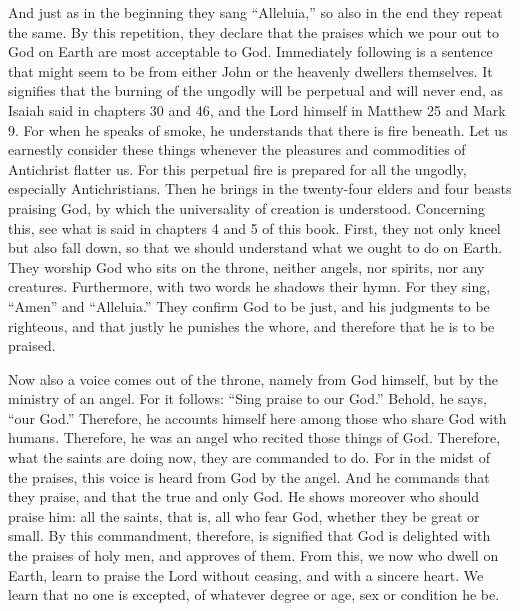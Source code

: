 And just as in the beginning they sang “Alleluia,” so also in the end they repeat the same. By this repetition, they declare that the praises which we pour out to God on Earth are most acceptable to God. Immediately following is a sentence that might seem to be from either John or the heavenly dwellers themselves. It signifies that the burning of the ungodly will be perpetual and will never end, as Isaiah said in chapters 30 and 46, and the Lord himself in Matthew 25 and Mark 9. For when he speaks of smoke, he understands that there is fire beneath. Let us earnestly consider these things whenever the pleasures and commodities of Antichrist flatter us. For this perpetual fire is prepared for all the ungodly, especially Antichristians. Then he brings in the twenty-four elders and four beasts praising God, by which the universality of creation is understood. Concerning this, see what is said in chapters 4 and 5 of this book. First, they not only kneel but also fall down, so that we should understand what we ought to do on Earth. They worship God who sits on the throne, neither angels, nor spirits, nor any creatures. Furthermore, with two words he shadows their hymn. For they sing, “Amen” and “Alleluia.” They confirm God to be just, and his judgments to be righteous, and that justly he punishes the whore, and therefore that he is to be praised.

Now also a voice comes out of the throne, namely from God himself, but by the ministry of an angel. For it follows: “Sing praise to our God.” Behold, he says, “our God.” Therefore, he accounts himself here among those who share God with humans. Therefore, he was an angel who recited those things of God. Therefore, what the saints are doing now, they are commanded to do. For in the midst of the praises, this voice is heard from God by the angel. And he commands that they praise, and that the true and only God. He shows moreover who should praise him: all the saints, that is, all who fear God, whether they be great or small. By this commandment, therefore, is signified that God is delighted with the praises of holy men, and approves of them. From this, we now who dwell on Earth, learn to praise the Lord without ceasing, and with a sincere heart. We learn that no one is excepted, of whatever degree or age, sex or condition he be.

